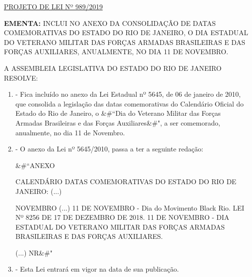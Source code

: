 \documentclass[10pt]{article}
\date{}
\begin{document}
\maketitle
\begin{center}
  \huge
  \vspace{-3cm}\href{http://alerjln1.alerj.rj.gov.br/scpro1923.nsf/f4b46b3cdbba990083256cc900746cf6/8f9212a4f6ac5a7e8325844e004d4373?OpenDocument}{PROJETO DE LEI Nº 989/2019}
\bigskip
\bigskip
\bigskip
  
\end{center}

\textbf{EMENTA:} 
INCLUI NO ANEXO DA CONSOLIDAÇÃO DE DATAS COMEMORATIVAS DO ESTADO DO RIO DE JANEIRO, O DIA ESTADUAL  DO VETERANO MILITAR DAS FORÇAS ARMADAS BRASILEIRAS E DAS FORÇAS AUXILIARES, ANUALMENTE, NO DIA 11 DE NOVEMBRO. 








\bigskip

\noindent
A ASSEMBLEIA LEGISLATIVA DO ESTADO DO RIO DE JANEIRO RESOLVE:

\begin{enumerate}[label=Art. \arabic*\textdegree]
\item - Fica incluído no anexo da Lei Estadual nº 5645, de 06 de janeiro de 2010, que consolida a legislação das datas comemorativas do Calendário Oficial do Estado do Rio de Janeiro, o &#``Dia do Veterano Militar das Forças Armadas Brasileiras e das Forças Auxiliares&#", a ser comemorado, anualmente, no dia 11 de Novembro.

\item - O anexo da Lei nº 5645/2010, passa a ter a seguinte redação:

&#``ANEXO

CALENDÁRIO DATAS COMEMORATIVAS DO ESTADO DO RIO DE JANEIRO:
(...)

NOVEMBRO
(...)
11 DE NOVEMBRO - Dia do Movimento Black Rio. LEI Nº 8256 DE 17 DE DEZEMBRO DE 2018.
11 DE NOVEMBRO - DIA ESTADUAL DO VETERANO MILITAR DAS FORÇAS ARMADAS BRASILEIRAS E DAS FORÇAS AUXILIARES.



(...) NR&#"




\item - Esta Lei entrará em vigor na data de sua publicação.




\end{enumerate}
\end{document}

